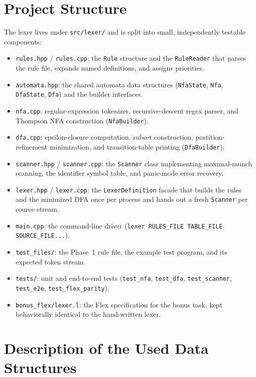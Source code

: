\documentclass[11pt,a4paper]{article}
\begin{document}
\section{Project Structure}
The lexer lives under \texttt{src/lexer/} and is split into small, independently
testable components:
\begin{itemize}
    \item \texttt{rules.hpp} / \texttt{rules.cpp}: the \texttt{Rule} structure and
          the \texttt{RuleReader} that parses the rule file, expands named
          definitions, and assigns priorities.
    \item \texttt{automata.hpp}: the shared automata data structures
          (\texttt{NfaState}, \texttt{Nfa}, \texttt{DfaState}, \texttt{Dfa}) and the
          builder interfaces.
    \item \texttt{nfa.cpp}: regular-expression tokenizer, recursive-descent regex
          parser, and Thompson NFA construction (\texttt{NfaBuilder}).
    \item \texttt{dfa.cpp}: epsilon-closure computation, subset construction,
          partition-refinement minimization, and transition-table printing
          (\texttt{DfaBuilder}).
    \item \texttt{scanner.hpp} / \texttt{scanner.cpp}: the \texttt{Scanner} class
          implementing maximal-munch scanning, the identifier symbol table, and
          panic-mode error recovery.
    \item \texttt{lexer.hpp} / \texttt{lexer.cpp}: the \texttt{LexerDefinition}
          facade that builds the rules and the minimized DFA once per process and
          hands out a fresh \texttt{Scanner} per source stream.
    \item \texttt{main.cpp}: the command-line driver
          (\texttt{lexer RULES\_FILE TABLE\_FILE SOURCE\_FILE...}).
    \item \texttt{test\_files/}: the Phase~1 rule file, the example test program,
          and its expected token stream.
    \item \texttt{tests/}: unit and end-to-end tests (\texttt{test\_nfa},
          \texttt{test\_dfa}, \texttt{test\_scanner}, \texttt{test\_e2e},
          \texttt{test\_flex\_parity}).
    \item \texttt{bonus\_flex/lexer.l}: the Flex specification for the bonus task,
          kept behaviorally identical to the hand-written lexer.
\end{itemize}

\section{Description of the Used Data Structures}
\end{document}
